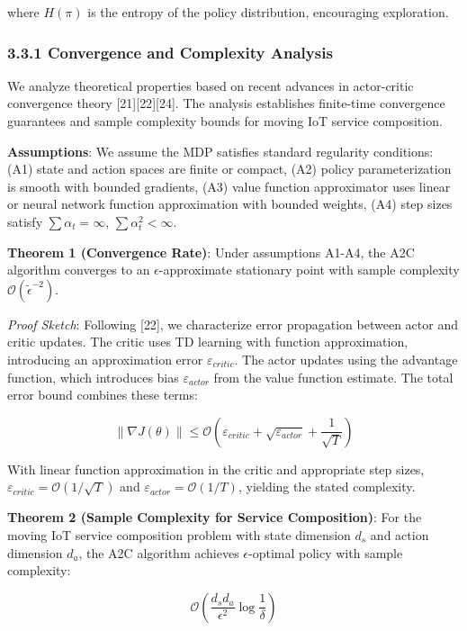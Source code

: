 where \(H(\pi)\) is the entropy of the policy distribution, encouraging
exploration.

\hypertarget{convergence-and-complexity-analysis}{%
	\subsubsection{3.3.1 Convergence and Complexity
		Analysis}\label{convergence-and-complexity-analysis}}

We analyze theoretical properties based on recent advances in
actor-critic convergence theory {[}21{]}{[}22{]}{[}24{]}. The analysis
establishes finite-time convergence guarantees and sample complexity
bounds for moving IoT service composition.

\textbf{Assumptions}: We assume the MDP satisfies standard regularity
conditions: (A1) state and action spaces are finite or compact, (A2)
policy parameterization is smooth with bounded gradients, (A3) value
function approximator uses linear or neural network function
approximation with bounded weights, (A4) step sizes satisfy
\(\sum \alpha_t = \infty\), \(\sum \alpha_t^2 < \infty\).

\textbf{Theorem 1 (Convergence Rate)}: Under assumptions A1-A4, the A2C
algorithm converges to an \(\epsilon\)-approximate stationary point with
sample complexity \(\mathcal{O}(\tilde{\epsilon}^{-2})\).

\emph{Proof Sketch}: Following {[}22{]}, we characterize error
propagation between actor and critic updates. The critic uses TD
learning with function approximation, introducing an approximation error
\(\varepsilon_{critic}\). The actor updates using the advantage
function, which introduces bias \(\varepsilon_{actor}\) from the value
function estimate. The total error bound combines these terms:

\[\| \nabla J(\theta) \| \leq \mathcal{O}(\varepsilon_{critic} + \sqrt{\varepsilon_{actor}} + \frac{1}{\sqrt{T}})\]

With linear function approximation in the critic and appropriate step
sizes, \(\varepsilon_{critic} = \mathcal{O}(1/\sqrt{T})\) and
\(\varepsilon_{actor} = \mathcal{O}(1/T)\), yielding the stated
complexity.

\textbf{Theorem 2 (Sample Complexity for Service Composition)}: For the
moving IoT service composition problem with state dimension \(d_s\) and
action dimension \(d_a\), the A2C algorithm achieves
\(\epsilon\)-optimal policy with sample complexity:

\[\mathcal{O}\left(\frac{d_s d_a}{\epsilon^2} \log\frac{1}{\delta}\right)\]

